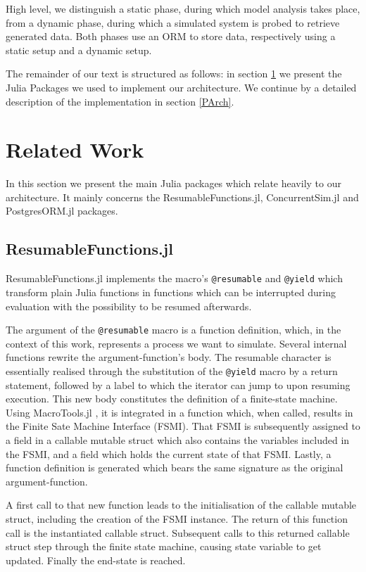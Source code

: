 \documentclass{juliacon}
\begin{document}
High level, we distinguish a static phase, during which model analysis takes place, from a dynamic phase, during which a simulated system is probed to retrieve generated data. Both phases use an ORM to store data, respectively using a static setup and a dynamic setup.\vskip 6pt

The remainder of our text is structured as follows: in section \ref{MainPackages} we present the Julia Packages we used to implement our architecture. We continue by a detailed description of the implementation in section \ref{PArch}.\vskip 6pt

\section{Related Work}\label{MainPackages}

In this section we present the main Julia packages which relate heavily to our architecture. It mainly concerns the ResumableFunctions.jl, ConcurrentSim.jl and PostgresORM.jl packages.\vskip 6pt

\subsection{ResumableFunctions.jl}
ResumableFunctions.jl \cite{lauwens2017resumablefunctions} implements the macro's \texttt{@resumable} and \texttt{@yield} which transform plain Julia functions in functions which can be interrupted during evaluation with the possibility to be resumed afterwards.\vskip 6pt

The argument of the \texttt{@resumable} macro is a function definition, which, in the context of this work, represents a process we want to simulate. Several internal functions rewrite the argument-function's body. The resumable character is essentially realised through the substitution of the \texttt{@yield} macro by a return statement, followed by a label to which the iterator can jump to upon resuming execution. This new body constitutes the definition of a finite-state machine. Using MacroTools.jl \cite{macrotools}, it is integrated in a function which, when called, results in the Finite Sate Machine Interface (FSMI). That FSMI is subsequently assigned to a field in a callable mutable struct which also contains the variables included in the FSMI, and a field which holds the current state of that FSMI. Lastly, a function definition is generated which bears the same signature as the original argument-function. \vskip 6pt

A first call to that new function leads to the initialisation of the callable mutable struct, including the creation of the FSMI instance. The return of this function call is the instantiated callable struct. Subsequent calls to this returned callable struct step through the finite state machine, causing state variable to get updated. Finally the end-state is reached. \vskip 6pt
\end{document}
